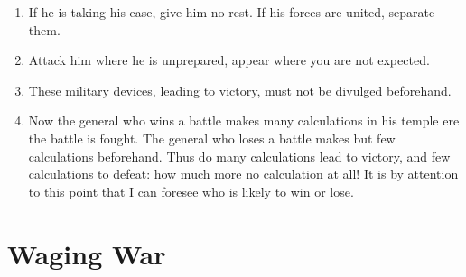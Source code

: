 \begin{enumerate}
\item If he is taking his ease, give him no rest. 
    If his forces are united, separate them.

\item Attack him where he is unprepared, appear where
    you are not expected.

\item These military devices, leading to victory,
    must not be divulged beforehand.

\item Now the general who wins a battle makes many
    calculations in his temple ere the battle is fought. 
    The general who loses a battle makes but few
    calculations beforehand.  Thus do many calculations
    lead to victory, and few calculations to defeat: 
    how much more no calculation at all!  It is by attention
    to this point that I can foresee who is likely to win or lose.
\end{enumerate}
\addtocounter{chapter}{1}\chapter*{Waging War}

